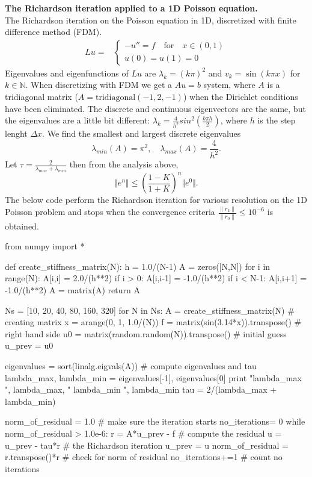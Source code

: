 \begin{example}{\textbf{The Richardson iteration applied to a  1D Poisson equation.}}\label{ex:1D_poisson}\\ %
The Richardson iteration on the Poisson equation in 1D, discretized with finite difference method (FDM).
\begin{align}
Lu =&\left\{ \begin{array}{lr}  -u'' = f \quad \text{for} \quad x \in (0,1)\\ 
u(0) = u(1) = 0  \end{array} \right.
\end{align}
Eigenvalues and eigenfunctions of $Lu$ are $\lambda_k = (k\pi)^2$ and $v_k = \sin(k\pi x) $ 
for $k \in \mathbb{N}$. 
When discretizing with FDM we get a $Au = b$ system, where $A$ is a tridiagonal matrix
($A = \text{tridiagonal}(-1,2,-1)$) when the Dirichlet conditions have
been eliminated. The discrete and continuous eigenvectors are the same, but the eigenvalues are a little 
bit different: $\lambda_{k} = \frac{4}{h^2}sin^2(\frac{k\pi h}{2})$, where $h$ is the step 
lenght $\Delta x$. We find the smallest and largest discrete eigenvalues
\[
\lambda_{min}(A) = \pi^2, \quad \lambda_{max}(A) = \frac{4}{h^2}. 
\]
Let $\tau = \frac{2}{\lambda_{max} + \lambda_{min}}$ then from the analysis above,
\[
\Vert e^n\Vert \le (\frac{1-K}{1+K})^{n}\Vert e^0 \Vert.
\]
The below code perform the Richardson iteration for various 
resolution on the 1D Poisson problem and stops when 
the convergence criteria $\frac{\|r_k\|}{\|r_0\|} \le 10^{-6}$ 
is obtained. 
\begin{python}
from numpy import * 

def create_stiffness_matrix(N): 
  h = 1.0/(N-1)
  A = zeros([N,N])
  for i in range(N): 
    A[i,i] = 2.0/(h**2) 
    if i > 0: 
      A[i,i-1] = -1.0/(h**2) 
    if i < N-1: 
      A[i,i+1] = -1.0/(h**2) 
  A = matrix(A)
  return A 

Ns = [10, 20, 40, 80, 160, 320] 
for N in Ns: 
  A = create_stiffness_matrix(N)              # creating matrix
  x = arange(0, 1, 1.0/(N))
  f = matrix(sin(3.14*x)).transpose()         # right hand side
  u0 = matrix(random.random(N)).transpose()   # initial guess 
  u_prev = u0 

  eigenvalues = sort(linalg.eigvals(A))       # compute eigenvalues and tau 
  lambda_max, lambda_min = eigenvalues[-1],  eigenvalues[0]
  print "lambda_max ", lambda_max, " lambda_min ", lambda_min
  tau = 2/(lambda_max + lambda_min)

  norm_of_residual = 1.0                      # make sure the iteration starts
  no_iterations= 0                        
  while norm_of_residual > 1.0e-6: 
    r = A*u_prev - f                          # compute the residual 
    u = u_prev - tau*r                        # the Richardson iteration 
    u_prev = u                                 
    norm_of_residual = r.transpose()*r        # check for norm of residual 
    no_iterations+=1                          # count no iterations  


\end{python}
\end{example}
